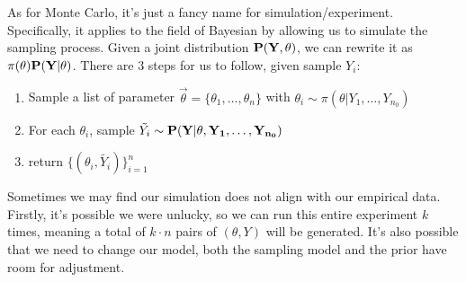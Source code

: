 As for Monte Carlo, it's just a fancy name for simulation/experiment. Specifically, it applies to the field of Bayesian by allowing us to simulate the sampling process. Given a joint distribution $\bf{P}(Y, \theta)$, we can rewrite it as $\pi(\theta)\bf{P}(Y|\theta)$. There are 3 steps for us to follow, given sample $Y_i$:
\begin{enumerate}
    \item Sample a list of parameter $\vec\theta = \{\theta_1, \ldots, \theta_n\}$ with $\theta_i \sim \pi(\theta | Y_1, \ldots, Y_{n_0})$
    \item For each $\theta_i$, sample $\tilde{Y_i} \sim \bf{P}(Y | \theta, Y_1, \ldots, Y_{n_0})$
    \item return $\{(\theta_i, \tilde{Y_i})\}_{i=1}^n$
\end{enumerate}

Sometimes we may find our simulation does not align with our empirical data. Firstly, it's possible we were unlucky, so we can run this entire experiment $k$ times, meaning a total of $k \cdot n$ pairs of $(\theta, Y)$ will be generated. It's also possible that we need to change our model, both the sampling model and the prior have room for adjustment.
